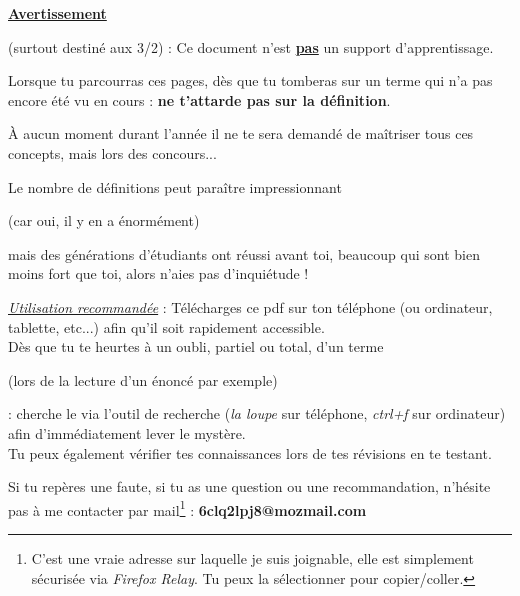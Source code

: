 \vspace{2cm}

\noindent\begin{Large} \textbf{\underline{Avertissement}}\end{Large} (surtout destiné aux 3/2) : Ce document n'est \underline{\textbf{pas}} un support d'apprentissage.

\vspace{3cm}

Lorsque tu parcourras ces pages, dès que tu tomberas sur un terme qui n'a pas encore été vu en cours : \textbf{ne t'attarde pas sur la définition}. 

\vspace{0.5cm}

À aucun moment durant l'année il ne te sera demandé de maîtriser tous ces concepts, mais lors des concours...

\vspace{0.5cm}

Le nombre de définitions peut paraître impressionnant \begin{small}(car oui, il y en a énormément)\end{small} mais des générations d'étudiants ont réussi avant toi, beaucoup qui sont bien moins fort que toi, alors n'aies pas d'inquiétude !

\vspace{3cm}

\underline{\emph{Utilisation recommandée}} : Télécharges ce pdf sur ton téléphone (ou ordinateur, tablette, etc...) afin qu'il soit rapidement accessible.\\
Dès que tu te heurtes à un oubli, partiel ou total, d'un terme \begin{small}(lors de la lecture d'un énoncé par exemple)\end{small} : cherche le via l'outil de recherche (\emph{la loupe} sur téléphone, \emph{ctrl+f} sur ordinateur) afin d'immédiatement lever le mystère.\vspace{0.2cm}\\
Tu peux également vérifier tes connaissances lors de tes révisions en te \guillemotleft testant\guillemotright.

\vspace{6cm}

\begin{center}\noindent Si tu repères une faute, si tu as une question ou une recommandation, n'hésite pas à me contacter par mail\footnote{C'est une vraie adresse sur laquelle je suis joignable, elle est simplement sécurisée via \emph{Firefox Relay}. Tu peux la sélectionner pour copier/coller.} :\hspace{0.3cm} \textbf{6clq2lpj8@mozmail.com} \end{center}

\vspace{1cm}